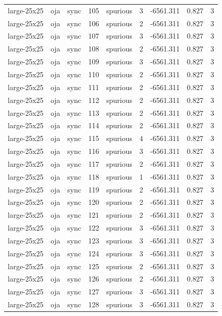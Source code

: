 \begin{tabular}{lllrlrrrr}
large-25x25 & oja & sync & 105 & spurious & 3 & -6561.311 & 0.827 & 3 \\
large-25x25 & oja & sync & 106 & spurious & 2 & -6561.311 & 0.827 & 3 \\
large-25x25 & oja & sync & 107 & spurious & 3 & -6561.311 & 0.827 & 3 \\
large-25x25 & oja & sync & 108 & spurious & 2 & -6561.311 & 0.827 & 3 \\
large-25x25 & oja & sync & 109 & spurious & 3 & -6561.311 & 0.827 & 3 \\
large-25x25 & oja & sync & 110 & spurious & 2 & -6561.311 & 0.827 & 3 \\
large-25x25 & oja & sync & 111 & spurious & 2 & -6561.311 & 0.827 & 3 \\
large-25x25 & oja & sync & 112 & spurious & 2 & -6561.311 & 0.827 & 3 \\
large-25x25 & oja & sync & 113 & spurious & 2 & -6561.311 & 0.827 & 3 \\
large-25x25 & oja & sync & 114 & spurious & 2 & -6561.311 & 0.827 & 3 \\
large-25x25 & oja & sync & 115 & spurious & 4 & -6561.311 & 0.827 & 3 \\
large-25x25 & oja & sync & 116 & spurious & 3 & -6561.311 & 0.827 & 3 \\
large-25x25 & oja & sync & 117 & spurious & 2 & -6561.311 & 0.827 & 3 \\
large-25x25 & oja & sync & 118 & spurious & 1 & -6561.311 & 0.827 & 3 \\
large-25x25 & oja & sync & 119 & spurious & 2 & -6561.311 & 0.827 & 3 \\
large-25x25 & oja & sync & 120 & spurious & 2 & -6561.311 & 0.827 & 3 \\
large-25x25 & oja & sync & 121 & spurious & 2 & -6561.311 & 0.827 & 3 \\
large-25x25 & oja & sync & 122 & spurious & 3 & -6561.311 & 0.827 & 3 \\
large-25x25 & oja & sync & 123 & spurious & 3 & -6561.311 & 0.827 & 3 \\
large-25x25 & oja & sync & 124 & spurious & 3 & -6561.311 & 0.827 & 3 \\
large-25x25 & oja & sync & 125 & spurious & 2 & -6561.311 & 0.827 & 3 \\
large-25x25 & oja & sync & 126 & spurious & 2 & -6561.311 & 0.827 & 3 \\
large-25x25 & oja & sync & 127 & spurious & 3 & -6561.311 & 0.827 & 3 \\
large-25x25 & oja & sync & 128 & spurious & 3 & -6561.311 & 0.827 & 3 \\

\end{tabular}
